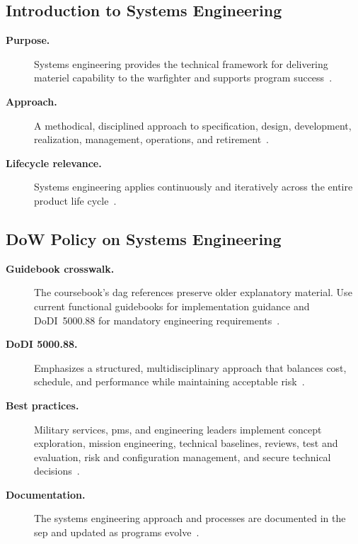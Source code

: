 \documentclass[../main.tex]{subfiles}
\begin{document}
\subsection{Introduction to Systems Engineering}
\begin{description}
  \item[\textbf{Purpose.}] Systems engineering provides the technical framework for delivering materiel capability to the warfighter and supports program success~\autocite{edo-3-5-1-systems-engineering-overview-2025}.
  \item[\textbf{Approach.}] A methodical, disciplined approach to specification, design, development, realization, management, operations, and retirement~\autocite{edo-3-5-1-systems-engineering-overview-2025}.
  \item[\textbf{Lifecycle relevance.}] Systems engineering applies continuously and iteratively across the entire product life cycle~\autocite{edo-3-5-1-systems-engineering-overview-2025}.
\end{description}

\subsection{DoW Policy on Systems Engineering}
\begin{description}
  \item[\textbf{Guidebook crosswalk.}] The coursebook's \ac{dag} references preserve older explanatory material. Use current functional guidebooks for implementation guidance and DoDI~5000.88 for mandatory engineering requirements~\autocite{DoDI5000-88,edo-3-5-1-systems-engineering-overview-2025}.
  \item[\textbf{DoDI 5000.88.}] Emphasizes a structured, multidisciplinary approach that balances cost, schedule, and performance while maintaining acceptable risk~\autocite{edo-3-5-1-systems-engineering-overview-2025}.
  \item[\textbf{Best practices.}] Military services, \acp{pm}, and engineering leaders implement concept exploration, mission engineering, technical baselines, reviews, test and evaluation, risk and configuration management, and secure technical decisions~\autocite{edo-3-5-1-systems-engineering-overview-2025}.
  \item[\textbf{Documentation.}] The systems engineering approach and processes are documented in the \ac{sep} and updated as programs evolve~\autocite{edo-3-5-1-systems-engineering-overview-2025}.
\end{description}
\end{document}
